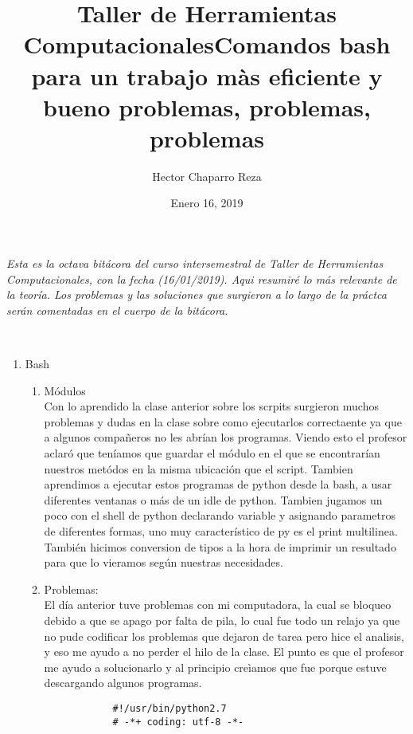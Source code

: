 \documentclass[letterpaper, 12pt, oneside]{article}
\title{\Huge{Taller de Herramientas Computacionales}}
\author{Hector Chaparro Reza}
\date{Enero 16, 2019}
\begin{document}
	\maketitle
	\it Esta es la octava bit\'acora del curso intersemestral de Taller de Herramientas Computacionales, con la fecha (16/01/2019). Aqui resumir\'e lo m\'as relevante de la teor\'ia. Los problemas y las soluciones que surgieron a lo largo de la pr\'actca ser\'an comentadas en el cuerpo de la bit\'acora.\\
	\newpage
	
	
	\title{\Huge{Comandos bash para un trabajo màs eficiente y bueno problemas, problemas, problemas}}\\
	
	\begin{enumerate}
		\item {Bash}
		\begin{enumerate}
			\item M\'odulos\\
			Con lo aprendido la clase anterior sobre los scrpits surgieron muchos problemas y dudas en la clase sobre como ejecutarlos correctaente ya que a algunos compañeros no les abrían los programas. Viendo esto el profesor aclaró que teníamos que guardar el módulo en el que se encontrarían nuestros metódos en la misma ubicación que el script. Tambien aprendimos a ejecutar estos programas de python desde la bash, a usar diferentes ventanas o más de un idle de python. Tambien jugamos un poco con el shell de python declarando variable y asignando parametros de diferentes formas, uno muy característico de py es el print multilinea. También hicimos conversion de tipos a la hora de imprimir un resultado para que lo vieramos según nuestras necesidades. \\
			
			\item Problemas:\\
			El día anterior tuve problemas con mi computadora, la cual se bloqueo debido a que se apago por falta de pila, lo cual fue todo un relajo ya que no pude codificar los problemas que dejaron de tarea pero hice el analisis, y eso me ayudo a no perder el hilo de la clase. El punto es que el profesor me ayudo a solucionarlo y al principio creìamos que fue porque estuve descargando algunos programas.  \\
			
			\begin{verbatim}
			#!/usr/bin/python2.7
			# -*+ coding: utf-8 -*-
			

\end{verbatim}
\end{enumerate}
\end{enumerate}
\end{document}
